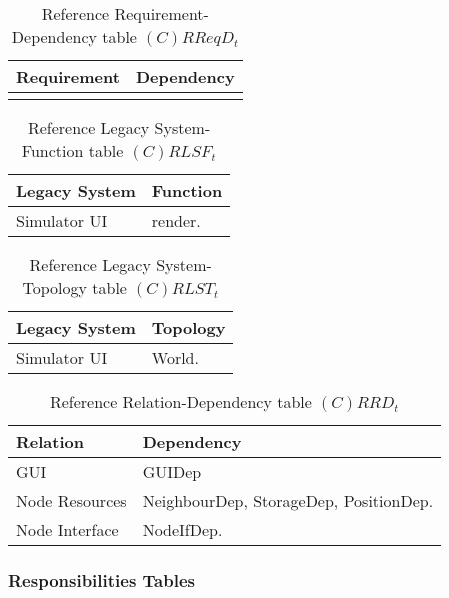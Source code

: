 \begin{table}[H]
	\centering
	\begin{tabular}{|p{4cm}|p{8cm}|}
			\hline
			\textbf{Requirement} & \textbf{Dependency} \\
			\hline
			 & \\
			\hline
		\end{tabular}
		\caption{Reference Requirement-Dependency table $(C)RReqD_t$}
	\label{tab:crreqdt}
\end{table}

\begin{table}[H]
	\centering
	\begin{tabular}{|p{4cm}|p{8cm}|}
			\hline
			\textbf{Legacy System} & \textbf{Function} \\
			\hline
			Simulator UI & render. \\
			\hline
		\end{tabular}
	\caption{Reference Legacy System-Function table $(C)RLSF_t$}
	\label{tab:crlsft}
\end{table}

\begin{table}[H]
	\centering
	\begin{tabular}{|p{4cm}|p{8cm}|}
			\hline
			\textbf{Legacy System} & \textbf{Topology} \\
			\hline
			Simulator UI & World. \\
			\hline
		\end{tabular}
	\caption{Reference Legacy System-Topology table $(C)RLST_t$}
	\label{tab:crlsTt}
\end{table}

\begin{table}[H]
	\centering
	\begin{tabular}{|p{4cm}|p{8cm}|}
			\hline
			\textbf{Relation} & \textbf{Dependency} \\
			\hline
			GUI & GUIDep \\
			\hline
			Node Resources & NeighbourDep, StorageDep, PositionDep. \\
			\hline
			Node Interface & NodeIfDep. \\
			\hline
		\end{tabular}
	\caption{Reference Relation-Dependency table $(C)RRD_t$}
	\label{tab:crrdt}
\end{table}

\subsubsection{Responsibilities Tables}

